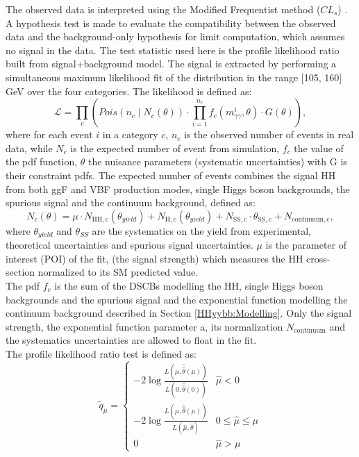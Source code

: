 The observed data is interpreted using the Modified Frequentist method ($CL_s$) \cite{CL_s}. A hypothesis test is made to evaluate the compatibility between the observed data and the background-only hypothesis for limit computation, which assumes no signal in the data. The test statistic used here is the profile likelihood ratio \cite{Z} built from signal+background model. The signal is extracted by performing a simultaneous maximum likelihood fit of the \myy distribution in the range [105, 160] GeV over the four categories. The likelihood is defined as: 
\begin{equation}
    \mathcal{L}=\prod_{c}\left(Pois\left(n_{c}
    \mid N_{c}(\theta)\right) \cdot \prod_{i=1}^{n_{c}}
    f_{c}\left(m_{\gamma \gamma}^{i}, \theta\right) \cdot G(\theta)\right),
\end{equation}
where for each event $i$ in a category $c$, $n_c$ is the observed number of events in real data, while $N_c$ is the expected number of event from simulation, 
$f_c$ the value of the pdf function, $\theta$ the nuisance parameters (systematic uncertainties) with G is their constraint pdfs. 
The expected number of events combines the signal HH from both ggF and VBF production modes, single Higgs boson backgrounds, the spurious signal and the continuum background, defined as: 
\begin{equation}
    N_{c}(\theta)=\mu \cdot N_{\mathrm{HH},
    \mathrm{c}}\left(\theta_{yield }\right)+N_{\mathrm{H},
    \mathrm{c}}\left(\theta_{yield }\right)+N_{\mathrm{SS},
    \mathrm{c}} \cdot \theta_{\mathrm{SS},
    \mathrm{c}}+N_{\text{continuum} , \mathrm{c}},
\end{equation}
where $\theta_{yield}$ and $\theta_{SS}$ are the systematics on the yield from experimental, theoretical uncertainties and spurious signal uncertainties. $\mu$ is the parameter of interest (POI) of the fit, (the signal strength) which measures the HH cross-section normalized to its SM predicted value. \\
The pdf $f_c$ is the sum of the DSCBs modelling the HH, single Higgs boson backgrounds and the spurious signal and the exponential function modelling the continuum background described in Section \ref{HHyybb:Modelling}. Only the signal strength, the exponential function parameter a, its normalization $N_{\text{continuum}}$ and the systematics uncertainties are allowed to float in the fit. \\
The profile likelihood ratio test is defined as: 
\begin{equation}
    \tilde{q}_{\mu}=\left\{\begin{array}{ll}
-2 \log \frac{L(\mu, \hat{\hat{\theta}}({\mu}))}{L(0, \hat{\hat{\theta}}(0))} & \hat{\mu}<0 \\
-2 \log \frac{L(\mu, \hat{\hat{\theta}}({\mu}))}{L(\hat{\mu}, \hat{\theta})} & 0 \leq \hat{\mu} \leq \mu \\
0 & \hat{\mu}>\mu
\end{array}\right.
\end{equation}
